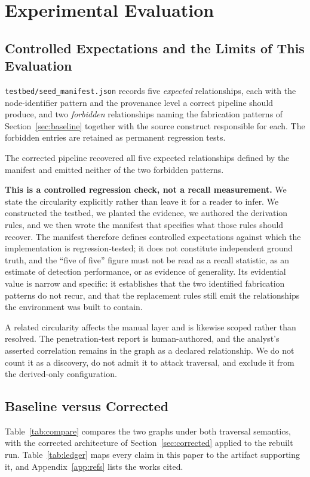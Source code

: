 \documentclass[11pt,a4paper]{article}
\begin{document}
\section{Experimental Evaluation}\label{sec:eval}
\subsection{Controlled Expectations and the Limits of This Evaluation}\label{sec:groundtruth}
\texttt{testbed/seed\_manifest.json} records five \emph{expected} relationships, each with the node-identifier pattern and the provenance level a correct pipeline should produce, and two \emph{forbidden} relationships naming the fabrication patterns of Section~\ref{sec:baseline} together with the source construct responsible for each. The forbidden entries are retained as permanent regression tests.

The corrected pipeline recovered all five expected relationships defined by the manifest and emitted neither of the two forbidden patterns.

\textbf{This is a controlled regression check, not a recall measurement.} We state the circularity explicitly rather than leave it for a reader to infer. We constructed the testbed, we planted the evidence, we authored the derivation rules, and we then wrote the manifest that specifies what those rules should recover. The manifest therefore defines controlled expectations against which the implementation is regression-tested; it does not constitute independent ground truth, and the ``five of five'' figure must not be read as a recall statistic, as an estimate of detection performance, or as evidence of generality. Its evidential value is narrow and specific: it establishes that the two identified fabrication patterns do not recur, and that the replacement rules still emit the relationships the environment was built to contain.

A related circularity affects the manual layer and is likewise scoped rather than resolved. The penetration-test report is human-authored, and the analyst's asserted correlation remains in the graph as a declared relationship. We do not count it as a discovery, do not admit it to attack traversal, and exclude it from the derived-only configuration.

\subsection{Baseline versus Corrected}
Table~\ref{tab:compare} compares the two graphs under both traversal semantics, with the corrected architecture of Section~\ref{sec:corrected} applied to the rebuilt run. Table~\ref{tab:ledger} maps every claim in this paper to the artifact supporting it, and Appendix~\ref{app:refs} lists the works cited.
\end{document}
